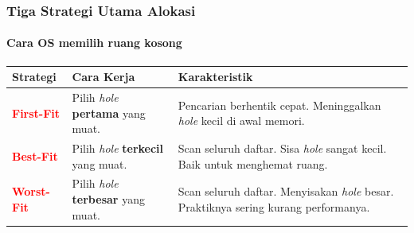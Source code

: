 \documentclass[t,aspectratio=169,xcolor=dvipsnames]{beamer}
\newcommand{\tem}[1]{\textbf{\textcolor{red}{#1}}}
\begin{document}
\begin{frame}
    \frametitle{Tiga Strategi Utama Alokasi}
    \framesubtitle{Cara OS memilih ruang kosong}
    \small
    \begin{table}[]
        \centering
        \begin{tabular}{p{}p{}p{}}
            \toprule
            \textbf{Strategi} & \textbf{Cara Kerja} & \textbf{Karakteristik} \\
            \midrule
            \tem{First-Fit} & Pilih \textit{hole} \textbf{pertama} yang muat. & Pencarian berhentik cepat. Meninggalkan \textit{hole} kecil di awal memori. \\
            \tem{Best-Fit} & Pilih \textit{hole} \textbf{terkecil} yang muat. & Scan seluruh daftar. Sisa \textit{hole} sangat kecil. Baik untuk menghemat ruang. \\
            \tem{Worst-Fit} & Pilih \textit{hole} \textbf{terbesar} yang muat. & Scan seluruh daftar. Menyisakan \textit{hole} besar. Praktiknya sering kurang performanya. \\
            \bottomrule
        \end{tabular}
    \end{table}
\end{frame}
\end{document}
